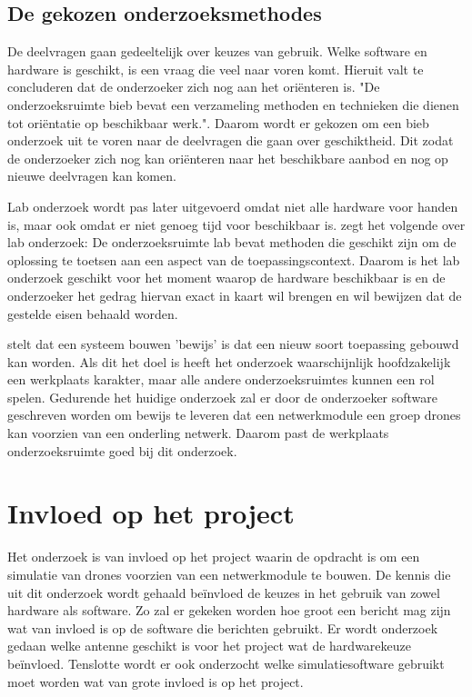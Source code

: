 \documentclass[a4paper, 11pt, oneside]{report}
\begin{document}
\subsection{De gekozen onderzoeksmethodes}

De deelvragen gaan gedeeltelijk over keuzes van gebruik. 
Welke software en hardware is geschikt, is een vraag die veel naar voren komt.
Hieruit valt te concluderen dat de onderzoeker zich nog aan het oriënteren is.
"De onderzoeksruimte bieb bevat een verzameling methoden en technieken die dienen tot oriëntatie op beschikbaar werk."\cite{MethodenKaart}.
Daarom wordt er gekozen om een bieb onderzoek uit te voren naar de deelvragen die gaan over geschiktheid.
Dit zodat de onderzoeker zich nog kan oriënteren naar het beschikbare aanbod en nog op nieuwe deelvragen kan komen. 

Lab onderzoek wordt pas later uitgevoerd omdat niet alle hardware voor handen is, maar ook omdat er niet genoeg tijd voor beschikbaar is.
\citeauthor{MethodenKaart} zegt het volgende over lab onderzoek: De onderzoeksruimte lab bevat methoden die geschikt zijn om de oplossing te toetsen aan een aspect van de toepassingscontext.
Daarom is het lab onderzoek geschikt voor het moment waarop de hardware beschikbaar is en de onderzoeker het gedrag hiervan exact in kaart wil brengen en wil bewijzen dat de gestelde eisen behaald worden.

 stelt dat een systeem bouwen 'bewijs' is dat een nieuw soort toepassing gebouwd kan worden. Als dit het doel is heeft het onderzoek waarschijnlijk hoofdzakelijk een werkplaats karakter, maar alle andere onderzoeksruimtes kunnen een rol spelen.
Gedurende het huidige onderzoek zal er door de onderzoeker software geschreven worden om bewijs te leveren dat een netwerkmodule een groep drones kan voorzien van een onderling netwerk.
Daarom past de werkplaats onderzoeksruimte goed bij dit onderzoek.


\section{Invloed op het project}

Het onderzoek is van invloed op het project waarin de opdracht is om een simulatie van drones voorzien van een netwerkmodule te bouwen.
De kennis die uit dit onderzoek wordt gehaald beïnvloed de keuzes in het gebruik van zowel hardware als software. 
Zo zal er gekeken worden hoe groot een bericht mag zijn wat van invloed is op de software die berichten gebruikt.
Er wordt onderzoek gedaan welke antenne geschikt is voor het project wat de hardwarekeuze beïnvloed.
Tenslotte wordt er ook onderzocht welke simulatiesoftware gebruikt moet worden wat van grote invloed is op het project.
\end{document}
